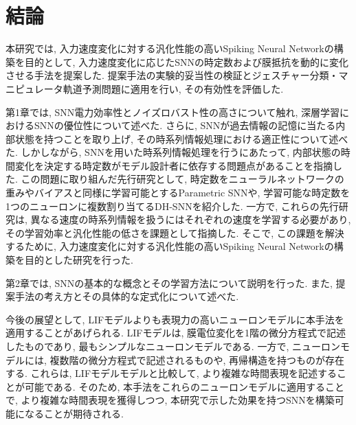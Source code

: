 \cleardoublepage %
\chapter{結論}

本研究では, 入力速度変化に対する汎化性能の高いSpiking Neural Networkの構築を目的として, 入力速度変化に応じたSNNの時定数および膜抵抗を動的に変化させる手法を提案した.
提案手法の実験的妥当性の検証とジェスチャー分類・マニピュレータ軌道予測問題に適用を行い, その有効性を評価した.

第1章では, SNN電力効率性とノイズロバスト性の高さについて触れ, 深層学習におけるSNNの優位性について述べた.
さらに, SNNが過去情報の記憶に当たる内部状態を持つことを取り上げ, その時系列情報処理における適正性について述べた.
しかしながら, SNNを用いた時系列情報処理を行うにあたって, 内部状態の時間変化を決定する時定数がモデル設計者に依存する問題点があることを指摘した.
この問題に取り組んだ先行研究として, 時定数をニューラルネットワークの重みやバイアスと同様に学習可能とするParametric SNNや, 学習可能な時定数を1つのニューロンに複数割り当てるDH-SNNを紹介した.
一方で, これらの先行研究は, 異なる速度の時系列情報を扱うにはそれぞれの速度を学習する必要があり, その学習効率と汎化性能の低さを課題として指摘した.
そこで, この課題を解決するために, 入力速度変化に対する汎化性能の高いSpiking Neural Networkの構築を目的とした研究を行った.

第2章では, SNNの基本的な概念とその学習方法について説明を行った.
また, 提案手法の考え方とその具体的な定式化について述べた.



今後の展望として, LIFモデルよりも表現力の高いニューロンモデルに本手法を適用することがあげられる.
LIFモデルは, 膜電位変化を1階の微分方程式で記述したものであり, 最もシンプルなニューロンモデルである.
一方で, ニューロンモデルには, 複数階の微分方程式で記述されるものや, 再帰構造を持つものが存在する.
これらは, LIFモデルモデルと比較して, より複雑な時間表現を記述することが可能である.
そのため, 本手法をこれらのニューロンモデルに適用することで, より複雑な時間表現を獲得しつつ, 本研究で示した効果を持つSNNを構築可能になることが期待される.
